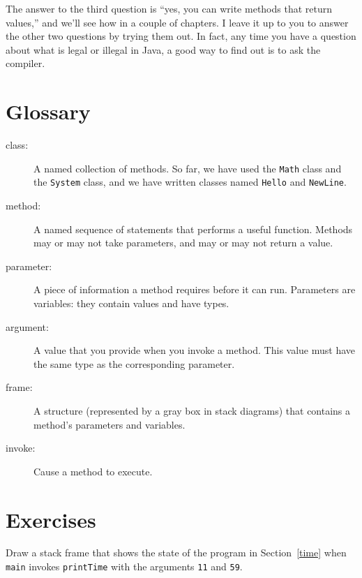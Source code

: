 The answer to the third question is ``yes, you can write methods that
return values,'' and we'll see how in a couple of chapters.  I
leave it up to you to answer the other two questions by trying them
out.  In fact, any time you have a question about what is legal or
illegal in Java, a good way to find out is to ask the compiler.


\section{Glossary}

\begin{description}

\item[class:]  A named collection of methods.  So far, we have used
the {\tt Math} class and the {\tt System} class, and we have
written classes named {\tt Hello} and {\tt NewLine}.

\item[method:]  A named sequence of statements that performs a
useful function.  Methods may or may not take parameters, and may
or may not return a value.

\item[parameter:]  A piece of information a method requires before
it can run.  Parameters are variables: they contain values and have types.

\item[argument:]  A value that you provide when you invoke a
method.  This value must have the same type as the corresponding
parameter.

\item[frame:] A structure (represented by a gray box in stack diagrams)
that contains a method's parameters and variables.

\item[invoke:]  Cause a method to execute.


\end{description}

\section{Exercises}

\begin{exercise}

Draw a stack frame that shows the state of the program in Section~\ref{time}
when {\tt main} invokes {\tt printTime}
with the arguments {\tt 11} and {\tt 59}.

\end{exercise}

